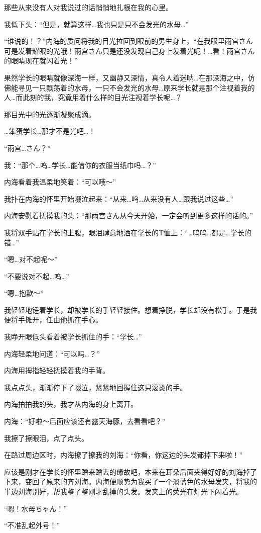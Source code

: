 那些从来没有人对我说过的话悄悄地扎根在我的心里。

我低下头：“但是，就算这样…我也只是只不会发光的水母…”

“谁说的！？”内海的质问将我的目光拉回到眼前的男生身上，“在我眼里雨宫さん可是发着耀眼的光哦！雨宫さん只是还没发现自己身上发着光呢！…看！雨宫さん的眼睛现在就闪着光！”

果然学长的眼睛就像深海一样，又幽静又深情，真令人着迷呐…在那深海之中，仿佛能寻见一只飘荡着的水母，一只不会发光的水母…原来学长就是那个注视着我的人…而此刻的我，究竟用着什么样的目光注视着学长呢…？

那目光中的光逐渐凝聚成滴。

…笨蛋学长…那才不是光吧…！

“雨宫…さん？”

我：“那个…呜…学长…能借你的衣服当纸巾吗…？”

内海看着我温柔地笑着：“可以哦～”

我扑在内海的怀里开始啜泣起来：“从来…呜…从来没有人…跟我说过这些…”

内海安慰着抚摸我的头：“那雨宫さん从今天开始，一定会听到更多这样的话的。”

我将双手贴在学长的上腹，眼泪肆意地洒在学长的T恤上：“…呜呜…都是…学长的错…”

“嗯…对不起呢～”

“不要说对不起…呜…”

“嗯…抱歉～”

我轻轻地锤着学长，却被学长的手轻轻接住。想着挣脱，学长却没有松手。于是我便将手摊开，任由他抓在手心。

我睁开眼低头看着被学长抓住的手：“学长…”

内海轻柔地问道：“可以吗…？”

内海用拇指轻轻抚摸着我的手背。

我点点头，渐渐停下了啜泣，紧紧地回握住这只滚烫的手。

内海拍拍我的头，我才从内海的身上离开。

内海：“好啦～后面应该还有露天海豚，去看看吧？”

我擦了擦眼泪，点了点头。

在路过周边区时，内海撩了撩我的刘海：“你看，你这边的头发都掉下来啦！”

应该是刚才在学长的怀里蹭来蹭去的缘故吧，本来在耳朵后面夹得好好的刘海掉了下来，变回了原来的齐刘海。内海便顺势为我买了一个淡蓝色的水母发夹，将我的半边刘海别好，帮我整了整刚才乱掉的头发。发夹上的荧光在灯光下闪着光。

“嗯！水母ちゃん！”

“不准乱起外号！”



